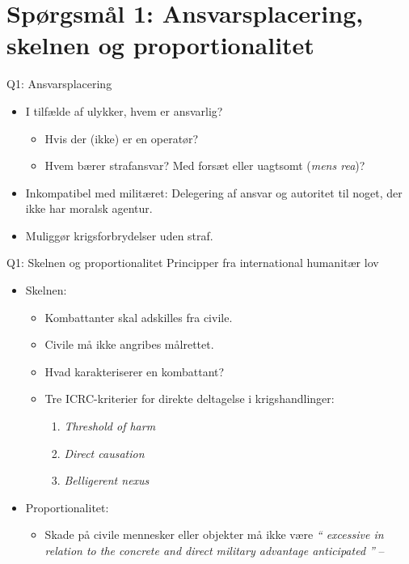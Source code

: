 \section{Spørgsmål 1: Ansvarsplacering, skelnen og proportionalitet}

\begin{frame}{Q1: Ansvarsplacering}
  \begin{itemize}
    \item I tilfælde af ulykker, hvem er ansvarlig?
      \begin{itemize}
        \item Hvis der (ikke) er en operatør?
        \item Hvem bærer strafansvar? Med forsæt eller uagtsomt (\textit{mens rea})?
      \end{itemize}
\pause
    \item Inkompatibel med militæret: Delegering af ansvar og autoritet til
      noget, der ikke har moralsk agentur.
    \item Muliggør krigsforbrydelser uden straf.
  \end{itemize}
\end{frame}

\begin{frame}{Q1: Skelnen og proportionalitet}
Principper fra international humanitær lov
\pause
  \begin{itemize}
    \item Skelnen:
      \begin{itemize}
        \item Kombattanter skal adskilles fra civile.
        \item Civile må ikke angribes målrettet.
        \item Hvad karakteriserer en kombattant?
\pause
        \item Tre ICRC-kriterier for direkte deltagelse i krigshandlinger:
          \begin{enumerate}
            \item \textit{Threshold of harm}
            \item \textit{Direct causation}
            \item \textit{Belligerent nexus}
          \end{enumerate}
      \end{itemize}
\pause
    \item Proportionalitet:
      \begin{itemize}
        \item Skade på civile mennesker eller objekter må ikke være
          \textit{
          \enquote{
            excessive in relation to the concrete and direct military advantage
            anticipated
          }}
          \newline
          -- \citep{a51}
      \end{itemize}
  \end{itemize}
\end{frame}


